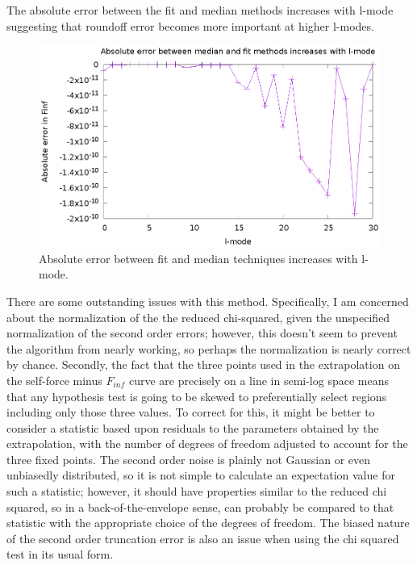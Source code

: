 The absolute error between the fit and median methods increases with l-mode suggesting that roundoff error becomes more important at higher l-modes.

\begin{figure}
  \includegraphics{absErrorIncreaseslmode}
  \caption{Absolute error between fit and median techniques increases with l-mode.}
  \label{abserrfitmedian}
\end{figure}

There are some outstanding issues with this method. Specifically, I am concerned about the normalization of the the reduced chi-squared, given the unspecified normalization of the second order errors; however, this doesn't seem to prevent the algorithm from nearly working, so perhaps the normalization is nearly correct by chance. Secondly, the fact that the three points used in the extrapolation on the self-force minus $F_{inf}$ curve are precisely on a line in semi-log space means that any hypothesis test is going to be skewed to preferentially select regions including only those three values. To correct for this, it might be better to consider a statistic based upon residuals to the parameters obtained by the extrapolation, with the number of degrees of freedom adjusted to account for the three fixed points. The second order noise is plainly not Gaussian or even unbiasedly distributed, so it is not simple to calculate an expectation value for such a statistic; however, it should have properties similar to the reduced chi squared, so in a back-of-the-envelope sense, can probably be compared to that statistic with the appropriate choice of the degrees of freedom. The biased nature of the second order truncation error is also an issue when using the chi squared test in its usual form. 



